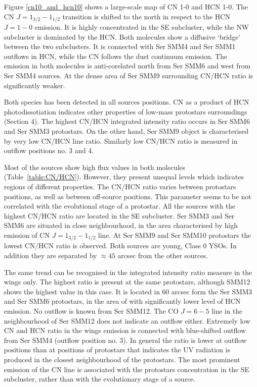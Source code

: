 \documentclass{aa}
\begin{document}
Figure \ref{cn10_and_hcn10} shows a large-scale map of CN 1-0 and HCN 1-0. The CN $J=1_{3/2}-1_{1/2}$ transition is shifted to the north in respect to the HCN $J=1-0$ emission. It is
highly concentrated in the SE subcluster, while the NW subcluster is dominated by the HCN. Both
molecules show a diffusive ‘bridge’ between the two subclusters. It is connected with Ser SMM4 and
Ser SMM1 outflows in HCN, while the CN follows the dust continuum emission. The emission in both
molecules is anti-corelated north from Ser SMM6 and west from Ser SMM4 sources. At the dense area of
Ser SMM9 surrounding CN/HCN ratio is significantly weaker.

Both species has been detected in all sources positions. CN as a product of HCN photodissotiation
indicates other properties of low-mass protostars surroundings (Section 4). The highest CN/HCN
integrated intensity ratio occurs in Ser SMM6 and Ser SMM3 protostars. On the other hand, Ser SMM9 object is characterised by very low CN/HCN line ratio.
Similarly low CN/HCN ratio is measured in outflow positions no. 3 and 4.

Most of the sources show high flux values in both molecules (Table~\ref{table:CN/HCN}). However,
they present unequal levels which indicates regions of different properties. The CN/HCN ratio varies
between protostars positions, as well as between off-source positions. This parameter seems to be not correlated with the
evolutional stage of a protostar. All the sources with the highest CN/HCN ratio are located in the
SE subcluster. Ser SMM3 and Ser SMM6 are situated in close neighbourhood, in the area characterised
by high emission of CN $J=1_{3/2}-1_{1/2}$ line. At Ser SMM9 and Ser SMM10 protostars the lowest CN/HCN ratio is
observed. Both sources are young, Class 0 YSOs. In addition they are separated by $\approx 45$
arcsec from the other sources.

The same trend can be recognised in the integrated intensity ratio measure in the wings only. The highest ratio is present at the same protostars, although SMM12 shows the highest value in this case. It is located in 60 arcsec form the Ser SMM3 and Ser SMM6 protostars, in the area of with significantly lower level of HCN emission. No outflow is known from Ser SMM12. The CO $J=6-5$ line in the neighbourhood of Ser SMM12 does not indicate an outflow either. Extremely low CN and HCN ratio in the wings emission is connected with blue-shifted outflow from Ser SMM4 (outflow position no. 3). In general the ratio is lower at outflow positions than at positions of protostars that indicates the UV radiation is produced in the closest neighbourhood of the protostars. The most prominent emission of the CN line is associated with the protostars concentration in the SE subcluster, rather than with the evolutionary stage of a source.
\end{document}
